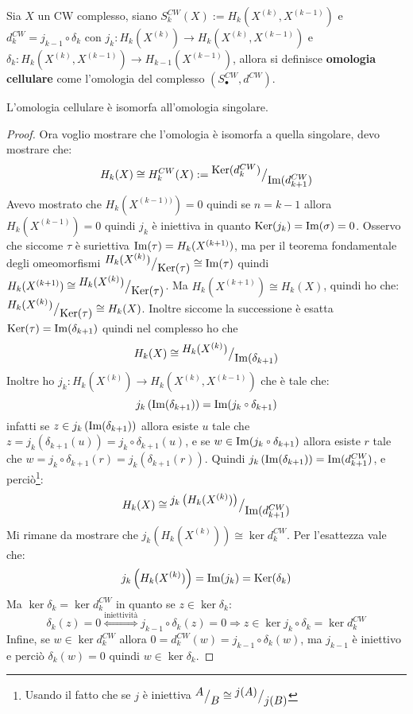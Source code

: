 \begin{definition}
  Sia $ X $ un CW complesso, siano $ S_k^{CW}(X) := H_k(X^{(k)}, X^{(k-1)}) $ e $ d_k^{CW} = j_{k-1} \circ \delta_k $
  con $ j_k \colon H_k(X^{(k)}) \to H_k(X^{(k)}, X^{(k-1)}) $ e $ \delta_k \colon H_k(X^{(k)}, X^{(k-1)}) \to  H_{k-1}(X^{(k-1)})  $,
  allora si definisce \textbf{omologia cellulare}
  come l'omologia del complesso $ (S_\bullet^{CW}, d^{CW}) $.
\end{definition}

\begin{proposition}
  L'omologia cellulare è isomorfa all'omologia singolare.
\end{proposition}
\begin{proof}
  Ora voglio mostrare che l'omologia è isomorfa a quella singolare, devo mostrare
  che:
  \[
    H_k(X) \cong H^{CW}_k(X) := {^{\textstyle \mathrm{Ker}( d_k^{CW})}\big/_{\textstyle \mathrm{Im}( d_{k+1}^{CW} )}}
  \]
  Avevo mostrato che
  $ H_k(X^{(k-1))}) = 0 $ quindi se $ n = k - 1 $ allora $ H_k(X^{(k-1)}) = 0 $ quindi
  $ j_k $ è iniettiva in quanto $ \mathrm{Ker}( j_k) = \mathrm{Im}( \sigma ) = 0 $.
  Osservo che siccome $ \tau $ è suriettiva $ \mathrm{Im}( \tau ) = H_k(X^{(k+1)}) $, ma per
  il teorema fondamentale degli omeomorfismi $ {^{\textstyle H_k(X^{(k)})}\big/_{\textstyle \mathrm{Ker}( \tau)}} \cong \mathrm{Im}( \tau ) $
  quindi $ H_k(X^{(k+1)}) \cong {^{\textstyle H_k(X^{(k)})}\big/_{\textstyle \mathrm{Ker}( \tau)}} $. Ma $ H_k(X^{(k+1)}) \cong H_k(X) $,
  quindi ho che: $ {^{\textstyle H_k(X^{(k)})}\big/_{\textstyle \mathrm{Ker}( \tau)}} \cong H_k(X) $. Inoltre siccome
  la successione è esatta $ \mathrm{Ker}( \tau) = \mathrm{Im}( \delta_{k+1} ) $ quindi
  nel complesso ho che
  \[
    H_k(X) \cong {^{\textstyle H_k(X^{(k)})}\big/_{\textstyle \mathrm{Im}( \delta_{k+1} )}}
  \]
  Inoltre ho $ j_k \colon H_k(X^{(k)}) \to H_k(X^{(k)}, X^{(k-1)}) $ che è tale che:
  \[
    j_k\left(\im{\delta_{k+1}}\right) = \im{j_k \circ \delta_{k+1}}
  \]
  infatti se $ z \in j_k\left(\mathrm{Im}( \delta_{k+1} )\right) $ allora esiste $ u $ tale che
  $ z = j_k(\delta_{k+1}(u)) = j_k \circ \delta_{k+1}(u) $, e se $ w \in \im{j_k \circ \delta_{k+1}} $ allora esiste $ r $ tale che
  $ w = j_k \circ \delta_{k+1}(r) = j_k(\delta_{k+1}(r)) $.
  Quindi $ j_k\left(\mathrm{Im}( \delta_{k+1} )\right) = \mathrm{Im}( d_{k+1}^{CW} ) $, e perciò\footnote{Usando il fatto che se
  $ j $ è iniettiva $ {^{\textstyle A}\big/_{\textstyle B}} \cong {^{\textstyle j(A)}\big/_{\textstyle j(B)}} $}:
  \[
    H_k(X) \cong {^{\textstyle j_k\left(H_k(X^{(k)})\right)}\big/_{\textstyle \mathrm{Im}( d^{CW}_{k+1} )}}
  \]
  Mi rimane da mostrare che $ j_k\left(H_k(X^{(k)})\right) \cong \ker{d_k^{CW}} $.
  Per l'esattezza vale che:
  \[
    j_k\left(H_k(X^{(k)})\right) = \mathrm{Im}( j_k ) = \mathrm{Ker}( \delta_k)
  \]
  Ma $ \ker{\delta_k} = \ker{d_k^{CW}} $ in quanto se $ z \in \ker{\delta_k} $:
  \[
    \delta_k(z) = 0 \overset{\text{iniettività}}{\iff} j_{k-1} \circ \delta_k(z) = 0 \Rightarrow z \in \ker{j_k \circ \delta_k} = \ker{d_k^{CW}}
  \]
  Infine, se $ w \in \ker{d_k^{CW}} $ allora $ 0 = d_k^{CW}(w) = j_{k-1} \circ \delta_k (w) $,
  ma $ j_{k-1} $ è iniettivo e perciò $ \delta_k(w) = 0 $ quindi $ w \in \ker{\delta_k} $.
\end{proof}


